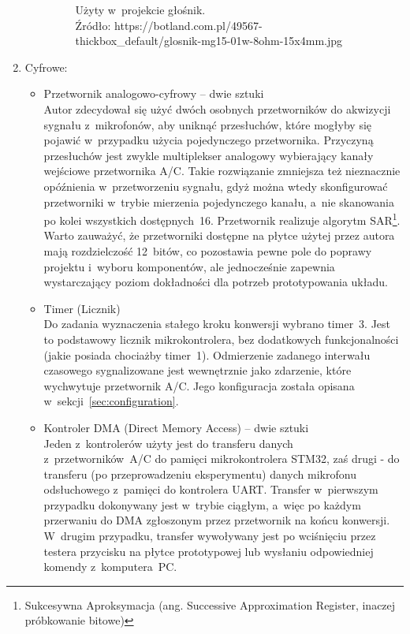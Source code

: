 \begin{enumerate}
\begin{itemize}
\begin{figure}[h!]
			\caption{Użyty w~projekcie głośnik.\\ Źródło: https://botland.com.pl/49567-thickbox\_default/glosnik-mg15-01w-8ohm-15x4mm.jpg}
			\label{fig:mg15}
		\end{figure}
	\end{itemize}
	\item Cyfrowe:
	\begin{itemize}
		\item Przetwornik analogowo-cyfrowy -- dwie sztuki\\
		Autor zdecydował się użyć dwóch osobnych przetworników do akwizycji sygnału z~mikrofonów, aby uniknąć przesłuchów, które mogłyby się pojawić w~przypadku użycia pojedynczego przetwornika. Przyczyną przesłuchów jest zwykle multiplekser analogowy wybierający kanały wejściowe przetwornika A/C. Takie rozwiązanie zmniejsza też nieznacznie opóźnienia w~przetworzeniu sygnału, gdyż można wtedy skonfigurować przetworniki w~trybie mierzenia pojedynczego kanału, a~nie skanowania po kolei wszystkich dostępnych~16. Przetwornik realizuje algorytm SAR\footnote{Sukcesywna Aproksymacja (ang. Successive Approximation Register, inaczej próbkowanie bitowe)}.\\
		Warto zauważyć, że przetworniki dostępne na płytce użytej przez autora mają rozdzielczość 12~bitów, co pozostawia pewne pole do poprawy projektu i~wyboru komponentów, ale jednocześnie zapewnia wystarczający poziom dokładności dla potrzeb prototypowania układu.
		\item Timer (Licznik)\\
		Do zadania wyznaczenia stałego kroku konwersji wybrano timer~3. Jest to podstawowy licznik mikrokontrolera, bez dodatkowych funkcjonalności (jakie posiada chociażby timer~1). Odmierzenie zadanego interwału czasowego sygnalizowane jest wewnętrznie jako zdarzenie, które wychwytuje przetwornik A/C. Jego konfiguracja została opisana w~sekcji~\ref{sec:configuration}.
		\item Kontroler DMA (Direct Memory Access) -- dwie sztuki\\
		Jeden z~kontrolerów użyty jest do transferu danych z~przetworników~A/C do pamięci mikrokontrolera STM32, zaś drugi - do transferu (po przeprowadzeniu eksperymentu) danych mikrofonu odsłuchowego z~pamięci do kontrolera UART. Transfer w~pierwszym przypadku dokonywany jest w~trybie ciągłym, a~więc po każdym przerwaniu do DMA zgłoszonym przez przetwornik na końcu konwersji. W~drugim przypadku, transfer wywoływany jest po wciśnięciu przez testera przycisku na płytce prototypowej lub wysłaniu odpowiedniej komendy z~komputera~PC.

\end{itemize}
\end{enumerate}
